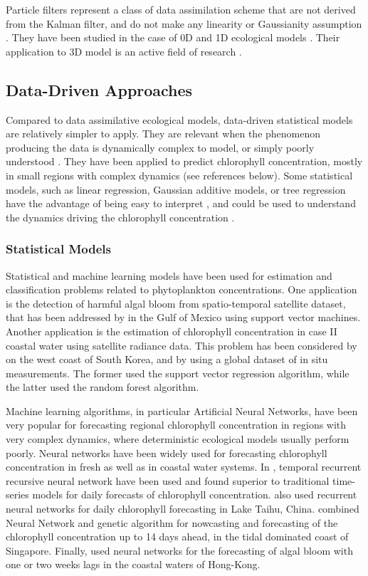 Particle filters represent a class of data assimilation scheme that are not
derived from the Kalman filter, and do not make any linearity or Gaussianity
assumption \citep{Edwards2015}. They have been studied in the case of 0D and 1D
ecological models \citep{Edwards2015}.  Their application to 3D model is an
active field of research \citep{Edwards2015}.


\subsection{Data-Driven Approaches}

Compared to data assimilative ecological models, data-driven statistical models
are relatively simpler to apply. They are relevant when the phenomenon
producing the data is dynamically complex to model, or simply poorly understood
\citep{Gareth2013}. They have been applied to predict chlorophyll
concentration, mostly in small regions with complex dynamics (see references
below). Some statistical models, such as linear regression, Gaussian additive
models, or tree regression have the advantage of being easy to interpret
\citep{Gareth2013}, and could be used to understand the dynamics driving the
chlorophyll concentration \citep{Raitsos2012}.

\subsubsection{Statistical Models}

Statistical and machine learning models have been used for estimation and
classification problems related to phytoplankton concentrations. One
application is the detection of harmful algal bloom from spatio-temporal
satellite dataset, that has been addressed by \citet{Gokaraju2011} in the Gulf
of Mexico using support vector machines. Another application is the estimation
of chlorophyll concentration in case II coastal water using satellite radiance
data. This problem has been considered by \citet{Kim2014} on the west coast of
South Korea, and by \citet{Camps-Valls2006} using a global dataset of in situ
measurements.  The former used the support vector regression algorithm, while
the latter used the random forest algorithm.

Machine learning algorithms, in particular Artificial Neural Networks, have
been very popular for forecasting regional chlorophyll concentration in regions
with very complex dynamics, where deterministic ecological models usually
perform poorly.  Neural networks have been widely used for forecasting
chlorophyll concentration in fresh as well as in coastal water systems. In
\citet{Jeong2006}, temporal recurrent recursive neural network have been used
and found superior to traditional time-series models for daily forecasts of
chlorophyll concentration.  \citet{Wang2013} also used recurrent neural
networks for daily chlorophyll forecasting in Lake Taihu, China.
\citet{Mulia2013} combined Neural Network and genetic algorithm for nowcasting
and forecasting of the chlorophyll concentration up to 14 days ahead, in the
tidal dominated coast of Singapore.  Finally, \citet{Lee2003} used neural
networks for the forecasting of algal bloom with one or two weeks lags in the
coastal waters of Hong-Kong.

